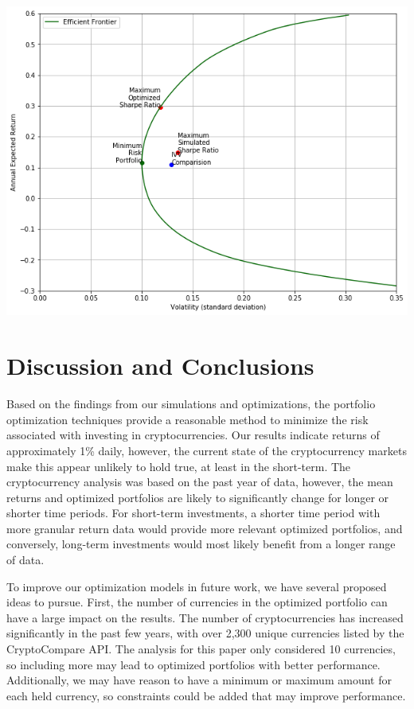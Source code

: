 \documentclass[11pt]{article} %
\begin{document}
\includegraphics[width=\textwidth]{sp1}
 
\section{Discussion and Conclusions}

Based on the findings from our simulations and optimizations, the portfolio optimization techniques provide a reasonable method to minimize the risk associated with investing in cryptocurrencies. Our results indicate returns of approximately 1\% daily, however, the current state of the cryptocurrency markets make this appear unlikely to hold true, at least in the short-term. The cryptocurrency analysis was based on the past year of data, however, the mean returns and optimized portfolios are likely to significantly change for longer or shorter time periods. For short-term investments, a shorter time period with more granular return data would provide more relevant optimized portfolios, and conversely, long-term investments would most likely benefit from a longer range of data.

To improve our optimization models in future work, we have several proposed ideas to pursue. First, the number of currencies in the optimized portfolio can have a large impact on the results. The number of cryptocurrencies has increased significantly in the past few years, with over 2,300 unique currencies listed by the CryptoCompare API. The analysis for this paper only considered 10 currencies, so including more may lead to optimized portfolios with better performance. Additionally, we may have reason to have a minimum or maximum amount for each held currency, so constraints could be added that may improve performance.
\end{document}
